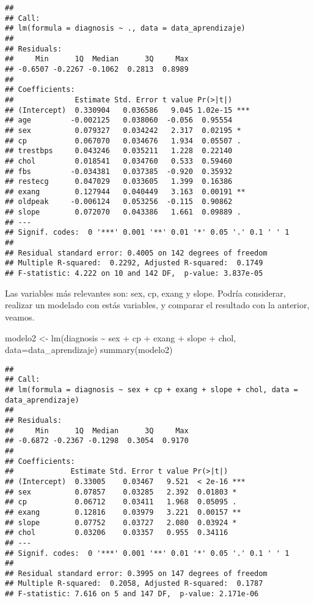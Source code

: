 \documentclass[
]{article}
\newenvironment{Shaded}{\begin{snugshade}}{\end{snugshade}}
\newcommand{\AttributeTok}[1]{\textcolor[rgb]{0.77,0.63,0.00}{#1}}
\newcommand{\FunctionTok}[1]{\textcolor[rgb]{0.00,0.00,0.00}{#1}}
\newcommand{\NormalTok}[1]{#1}
\newcommand{\OtherTok}[1]{\textcolor[rgb]{0.56,0.35,0.01}{#1}}
\newcommand{\SpecialCharTok}[1]{\textcolor[rgb]{0.00,0.00,0.00}{#1}}
\begin{document}
\begin{verbatim}
## 
## Call:
## lm(formula = diagnosis ~ ., data = data_aprendizaje)
## 
## Residuals:
##     Min      1Q  Median      3Q     Max 
## -0.6507 -0.2267 -0.1062  0.2813  0.8989 
## 
## Coefficients:
##              Estimate Std. Error t value Pr(>|t|)    
## (Intercept)  0.330904   0.036586   9.045 1.02e-15 ***
## age         -0.002125   0.038060  -0.056  0.95554    
## sex          0.079327   0.034242   2.317  0.02195 *  
## cp           0.067070   0.034676   1.934  0.05507 .  
## trestbps     0.043246   0.035211   1.228  0.22140    
## chol         0.018541   0.034760   0.533  0.59460    
## fbs         -0.034381   0.037385  -0.920  0.35932    
## restecg      0.047029   0.033605   1.399  0.16386    
## exang        0.127944   0.040449   3.163  0.00191 ** 
## oldpeak     -0.006124   0.053256  -0.115  0.90862    
## slope        0.072070   0.043386   1.661  0.09889 .  
## ---
## Signif. codes:  0 '***' 0.001 '**' 0.01 '*' 0.05 '.' 0.1 ' ' 1
## 
## Residual standard error: 0.4005 on 142 degrees of freedom
## Multiple R-squared:  0.2292, Adjusted R-squared:  0.1749 
## F-statistic: 4.222 on 10 and 142 DF,  p-value: 3.837e-05
\end{verbatim}

Las variables más relevantes son: sex, cp, exang y slope. Podría
considerar, realizar un modelado con estás variables, y comparar el
resultado con la anterior, veamos.

\begin{Shaded}
\begin{Highlighting}[]
\NormalTok{modelo2 }\OtherTok{\textless{}{-}} \FunctionTok{lm}\NormalTok{(diagnosis }\SpecialCharTok{\textasciitilde{}}\NormalTok{ sex }\SpecialCharTok{+}\NormalTok{ cp }\SpecialCharTok{+}\NormalTok{ exang }\SpecialCharTok{+}\NormalTok{ slope }\SpecialCharTok{+}\NormalTok{ chol, }\AttributeTok{data=}\NormalTok{data\_aprendizaje)}
\FunctionTok{summary}\NormalTok{(modelo2)}
\end{Highlighting}
\end{Shaded}

\begin{verbatim}
## 
## Call:
## lm(formula = diagnosis ~ sex + cp + exang + slope + chol, data = data_aprendizaje)
## 
## Residuals:
##     Min      1Q  Median      3Q     Max 
## -0.6872 -0.2367 -0.1298  0.3054  0.9170 
## 
## Coefficients:
##             Estimate Std. Error t value Pr(>|t|)    
## (Intercept)  0.33005    0.03467   9.521  < 2e-16 ***
## sex          0.07857    0.03285   2.392  0.01803 *  
## cp           0.06712    0.03411   1.968  0.05095 .  
## exang        0.12816    0.03979   3.221  0.00157 ** 
## slope        0.07752    0.03727   2.080  0.03924 *  
## chol         0.03206    0.03357   0.955  0.34116    
## ---
## Signif. codes:  0 '***' 0.001 '**' 0.01 '*' 0.05 '.' 0.1 ' ' 1
## 
## Residual standard error: 0.3995 on 147 degrees of freedom
## Multiple R-squared:  0.2058, Adjusted R-squared:  0.1787 
## F-statistic: 7.616 on 5 and 147 DF,  p-value: 2.171e-06
\end{verbatim}
\end{document}
